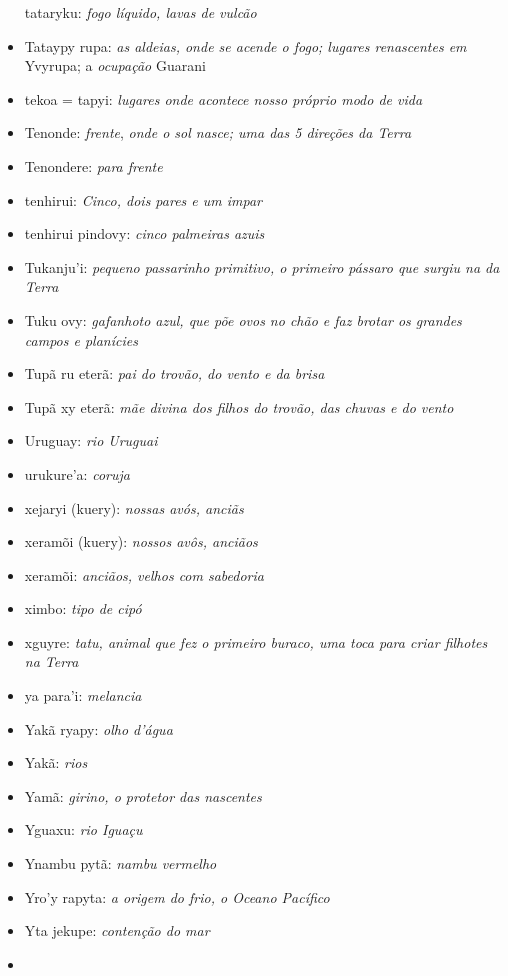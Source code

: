 \begin{itemize}
  tataryku: \emph{fogo líquido, lavas de vulcão}
\item
  Tataypy rupa: \emph{as aldeias, onde se acende o fogo; lugares
  renascentes em} Yvyrupa; a \emph{ocupação} Guarani
\item
  tekoa = tapyi: \emph{lugares onde acontece nosso próprio modo de vida}
\item
  Tenonde: \emph{frente}, \emph{onde o sol nasce; uma das 5 direções da
  Terra}
\item
  Tenondere: \emph{para frente}
\item
  tenhirui: \emph{Cinco, dois pares e um impar}
\item
  tenhirui pindovy: \emph{cinco palmeiras azuis}
\item
  Tukanju'i: \emph{pequeno passarinho primitivo, o primeiro pássaro que
  surgiu na da Terra}
\item
  Tuku ovy: \emph{gafanhoto azul, que põe ovos no chão e faz brotar os
  grandes campos e planícies}
\item
  Tupã ru eterã: \emph{pai do trovão, do vento e da brisa}
\item
  Tupã xy eterã: \emph{mãe divina dos filhos do trovão, das chuvas e do
  vento}
\item
  Uruguay: \emph{rio Uruguai}
\item
  urukure'a: \emph{coruja}
\item
  xejaryi (kuery): \emph{nossas avós, anciãs}
\item
  xeramõi (kuery): \emph{nossos avôs, anciãos}
\item
  xeramõi: \emph{anciãos, velhos com sabedoria}
\item
  ximbo: \emph{tipo de cipó}
\item
  xguyre: \emph{tatu, animal que fez o primeiro buraco, uma toca para
  criar filhotes na Terra}
\item
  ya para'i: \emph{melancia}
\item
  Yakã ryapy: \emph{olho d'água}
\item
  Yakã: \emph{rios}
\item
  Yamã: \emph{girino, o protetor das nascentes}
\item
  Yguaxu: \emph{rio Iguaçu}
\item
  Ynambu pytã: \emph{nambu vermelho}
\item
  Yro'y rapyta: \emph{a origem do frio, o Oceano Pacífico}
\item
  Yta jekupe: \emph{contenção do mar}
\item

\end{itemize}

